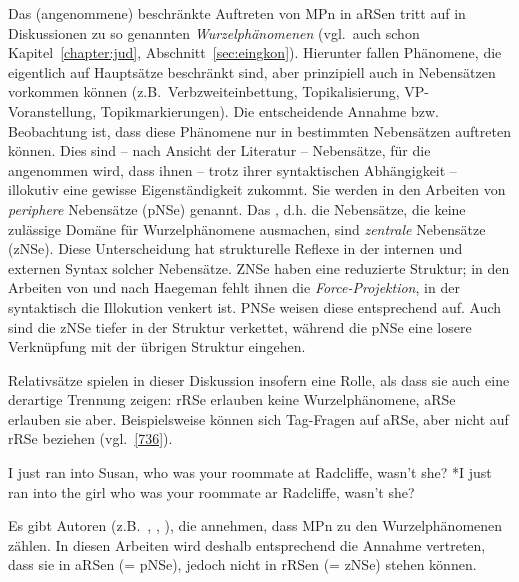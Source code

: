 Das (angenommene) beschränkte Auftreten von MPn in aRSen tritt auf in Diskussionen zu so genannten \textit{Wurzelphänomenen} (vgl.\ auch schon Kapitel~\ref{chapter:jud}, Abschnitt~\ref{sec:eingkon}). Hierunter fallen Phänomene, die eigentlich auf Hauptsätze be\-schränkt sind, aber prinzipiell auch in Nebensätzen vorkommen können (z.B.\ Verbzweiteinbettung, Topikalisierung, VP-Voranstellung, Topikmarkierungen\linebreak{}). Die entscheidende Annahme bzw. Beobachtung ist, dass diese Phänomene nur in bestimmten Nebensätzen auftreten können. Dies sind – nach Ansicht der Literatur – Nebensätze, für die angenommen wird, dass ihnen – trotz ihrer syntaktischen Abhängigkeit – illokutiv eine gewisse Eigenständigkeit zukommt. Sie werden in den Arbeiten von \citet{Haegeman2002, Haegeman2004, Haegeman2006} \textit{periphere} Nebensätze  (pNSe) genannt. Das , d.h. die Nebensätze, die keine zulässige Domäne für Wurzelphänomene ausmachen, sind \textit{zentrale} Nebensätze (zNSe). Diese Unterscheidung hat strukturelle Reflexe in der internen und externen Syntax solcher Nebensätze. ZNSe haben eine reduzierte Struktur; in den Arbeiten von und nach Haegeman fehlt ihnen die  \textit{Force-Projektion}, in der syntaktisch die Illokution venkert ist. PNSe weisen diese entspre\-chend auf. Auch sind die zNSe tiefer in der Struktur verkettet, während die pNSe eine losere Verknüpfung mit der übrigen Struktur eingehen.

Relativsätze spielen in dieser Diskussion insofern eine Rolle, als dass sie auch eine derartige Trennung zeigen: rRSe erlauben keine Wurzelphänomene, aRSe erlauben sie aber. Beispielsweise können sich Tag-Fragen  auf aRSe, aber nicht auf rRSe beziehen (vgl.\ \ref{736}).

\begin{exe}
	\ex\label{736} 
		\begin{xlist}	
			\ex\label{736a} I just ran into Susan, who was your roommate at Radcliffe, wasn’t she?
			\ex\label{736b} *I just ran into the girl who was your roommate ar Radcliffe, wasn’t she?
			\hfill\hbox{\citet[490]{Hooper1973}}
		\end{xlist}
\end{exe}
Es gibt Autoren (z.B.\ \citealt{Coniglio2011}, \citealt{Frey2011, Frey2012}, \citealt{Abraham2012}), die annehmen, dass MPn zu den Wurzelphänomenen zählen. In diesen Arbeiten wird deshalb entsprechend die Annahme vertreten, dass sie in aRSen (= pNSe), jedoch nicht in rRSen (= zNSe) stehen können.

